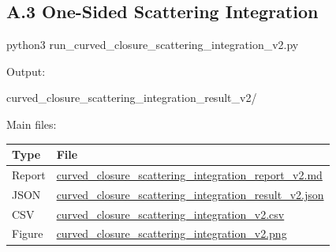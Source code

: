 \documentclass[
  a4paper,
]{article}
\newenvironment{Shaded}{}{}
\newcommand{\NormalTok}[1]{#1}
\newcounter{none} %
\begin{document}
\subsection{A.3 One-Sided Scattering
Integration}\label{a.3-one-sided-scattering-integration}

\begin{Shaded}
\begin{Highlighting}[]
\NormalTok{python3 run\_curved\_closure\_scattering\_integration\_v2.py}
\end{Highlighting}
\end{Shaded}

Output:

\begin{Shaded}
\begin{Highlighting}[]
\NormalTok{curved\_closure\_scattering\_integration\_result\_v2/}
\end{Highlighting}
\end{Shaded}

Main files:

{\def\LTcaptype{none} %
\begin{longtable}[]{@{}
  >{\raggedright\arraybackslash}p{}
  >{\raggedright\arraybackslash}p{}@{}}
\toprule\noalign{}
\begin{minipage}[b]{\linewidth}\raggedright
Type
\end{minipage} & \begin{minipage}[b]{\linewidth}\raggedright
File
\end{minipage} \\
\midrule\noalign{}
\endhead
\bottomrule\noalign{}
\endlastfoot
Report &
\href{curved_closure_scattering_integration_result_v2/curved_closure_scattering_integration_report_v2.md}{curved\_closure\_scattering\_integration\_report\_v2.md} \\
JSON &
\href{curved_closure_scattering_integration_result_v2/curved_closure_scattering_integration_result_v2.json}{curved\_closure\_scattering\_integration\_result\_v2.json} \\
CSV &
\href{curved_closure_scattering_integration_result_v2/curved_closure_scattering_integration_v2.csv}{curved\_closure\_scattering\_integration\_v2.csv} \\
Figure &
\href{curved_closure_scattering_integration_result_v2/curved_closure_scattering_integration_v2.png}{curved\_closure\_scattering\_integration\_v2.png} \\
\end{longtable}
}
\end{document}
